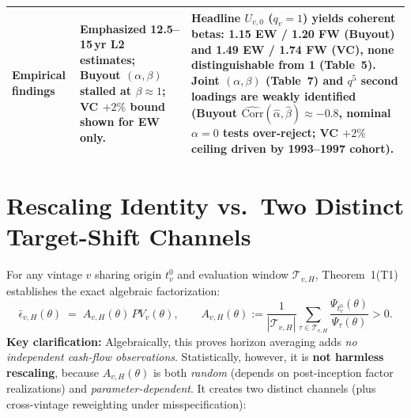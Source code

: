 \documentclass[10.5pt]{article}
\newcommand{\T}{\mathcal{T}}
\begin{document}
{\begin{tabularx}{\textwidth}{@{}>{\raggedright\arraybackslash}p{2.4cm} X X@{}}
\addlinespace[2pt]
\textbf{Empirical findings} &
  Emphasized 12.5--15\,yr L2 estimates; Buyout $(\alpha,\beta)$ stalled at $\beta\approx 1$; VC $+2\%$ bound shown for EW only. &
  Headline $U_{v,0}$ ($q_v=1$) yields coherent betas: \textbf{1.15 EW / 1.20 FW} (Buyout) and \textbf{1.49 EW / 1.74 FW} (VC), none distinguishable from 1 (Table~5). Joint $(\alpha,\beta)$ (Table~7) and $q^5$ second loadings are weakly identified (Buyout $\widehat{\mathrm{Corr}}(\hat\alpha,\hat\beta)\approx -0.8$, nominal $\alpha=0$ tests over-reject; VC $+2\%$ ceiling driven by 1993--1997 cohort). \\
\bottomrule
\end{tabularx}
}

\section{Rescaling Identity vs.\ Two Distinct Target-Shift Channels}
\label{sec:channels}

For any vintage $v$ sharing origin $t_v^0$ and evaluation window $\T_{v,H}$, Theorem~1(T1) establishes the exact algebraic factorization:
\[
\bar\epsilon_{v,H}(\theta) \;=\; A_{v,H}(\theta)\,PV_v(\theta),
\qquad
A_{v,H}(\theta) := \frac{1}{|\T_{v,H}|}\sum_{\tau\in\T_{v,H}} \frac{\Psi_{t_v^0}(\theta)}{\Psi_\tau(\theta)} > 0.
\]
\textbf{Key clarification:} Algebraically, this proves horizon averaging adds \emph{no independent cash-flow observations}. Statistically, however, it is \textbf{not harmless rescaling}, because $A_{v,H}(\theta)$ is both \emph{random} (depends on post-inception factor realizations) and \emph{parameter-dependent}. It creates two distinct channels (plus cross-vintage reweighting under misspecification):
\end{document}

